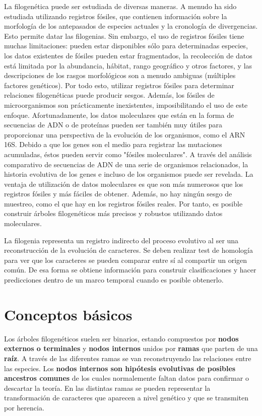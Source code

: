 La filogenética puede ser estudiada de diversas maneras. A menudo ha sido estudiada utilizando registros fósiles, que contienen información sobre la morfología de los antepasados de especies actuales y la cronología de divergencias. Esto permite datar las filogenias. Sin embargo, el uso de registros fósiles tiene muchas limitaciones: pueden estar disponibles sólo para determinadas especies, los datos existentes de fósiles pueden estar fragmentados, la recolección de datos está limitada por la abundancia, hábitat, rango geográfico y otros factores, y las descripciones de los rasgos morfológicos son a menudo ambiguas (múltiples factores genéticos). Por todo esto, utilizar registros fósiles para determinar relaciones filogenéticas puede producir sesgos. Además, los fósiles de microorganismos son prácticamente inexistentes, imposibilitando el uso de este enfoque. Afortunadamente, los datos moleculares que están en la forma de secuencias de ADN o de proteínas pueden ser también muy útiles para proporcionar una perspectiva de la evolución de los organismos, como el ARN 16S. Debido a que los genes son el medio para registrar las mutaciones acumuladas, éstos pueden servir como "fósiles moleculares". A través del análisis comparativo de secuencias de ADN de una serie de organismos relacionados, la historia evolutiva de los genes e incluso de los organismos puede ser revelada. La ventaja de utilización de datos moleculares es que son más numerosos que los registros fósiles y más fáciles de obtener. Además, no hay ningún sesgo de muestreo, como el que hay en los registros fósiles reales. Por tanto, es posible construir árboles filogenéticos más precisos y robustos utilizando datos moleculares. 

La filogenia representa un registro indirecto del proceso evolutivo al ser una reconstrucción de la evolución de caracteres. Se deben realizar test de homología para ver que los caracteres se pueden comparar entre sí al compartir un origen común. De esa forma se obtiene información para construir clasificaciones y hacer predicciones dentro de un marco temporal cuando es posible obtenerlo.

\section{Conceptos básicos}
Los árboles filogenéticos suelen ser binarios, estando compuestos por \textbf{nodos externos o terminales} y \textbf{nodos internos} unidos por \textbf{ramas} que parten de una \textbf{raíz}. A través de las diferentes ramas se van reconstruyendo las relaciones entre las especies. Los \textbf{nodos internos son hipótesis evolutivas de posibles ancestros comunes} de los cuales normalemente faltan datos para confirmar o descartar la teoría. En las distintas ramas se pueden representar la transformación de caracteres que aparecen a nivel genético y que se transmiten por herencia.  

